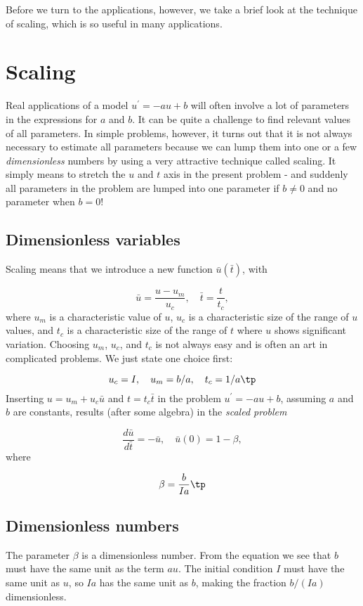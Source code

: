 \documentclass[graybox,sectrefs,envcountresetchap,open=right,final]{svmonodo}
\begin{document}
Before we turn to the applications, however, we take a brief look at
the technique of scaling, which is so useful in many applications.

\section{Scaling}
\label{decay:app:scaling}

Real applications of a model $u^{\prime}=-au+b$ will often involve a lot
of parameters in the expressions for $a$ and $b$. It can be quite
a challenge to find relevant values of all parameters. In simple
problems, however, it turns out that it is not always necessary
to estimate all parameters because we can lump them into one or
a few \emph{dimensionless} numbers by using a very attractive technique
called scaling. It simply means to stretch the $u$ and $t$ axis
in the present problem - and suddenly all parameters in the problem
are lumped into one parameter if $b\neq 0$ and no parameter when $b=0$!

\subsection{Dimensionless variables}

Scaling means that we introduce a new function $\bar u(\bar t)$,
with

\[ \bar u = \frac{u - u_m}{u_c},\quad \bar t = \frac{t}{t_c},\]
where $u_m$ is a characteristic value of $u$, $u_c$ is a characteristic
size of the range of $u$ values, and $t_c$ is a characteristic
size of the range of $t$ where $u$ shows significant variation.
Choosing $u_m$, $u_c$, and $t_c$ is not always easy and is often an art
in complicated problems. We just state one choice first:

\[ u_c = I,\quad u_m = b/a,\quad t_c = 1/a\tp\]
Inserting $u=u_m + u_c\bar u$ and $t=t_c\bar t$ in the problem
$u^{\prime}=-au + b$, assuming $a$ and $b$ are constants, results (after some
algebra) in the \emph{scaled problem}

\[ \frac{d\bar u}{d\bar t} = -\bar u,\quad \bar u(0)=1 - \beta,\]
where

\[ \beta = \frac{b}{Ia}\tp\]

\subsection{Dimensionless numbers}

The parameter $\beta$ is a dimensionless number. From the equation we
see that $b$ must have the same unit as the term $au$. The initial
condition $I$ must have the same unit as $u$, so $Ia$ has the same
unit as $b$, making the fraction $b/(Ia)$ dimensionless.
\end{document}
